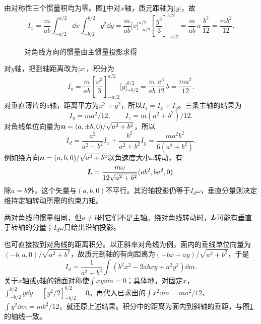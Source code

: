 \begin{solution}
由对称性三个惯量积均为零。图\ref{fig:hw6-1-s}中对$x$轴，质元距轴为$|y|$，故
\[
 I_x=\frac m{ab}\int_{-a/2}^{a/2}\dd x\int_{-b/2}^{b/2}y^2\dd y
 =\frac m{ab}\bigl[x\bigr]_{-a/2}^{a/2}
 \left[\frac{y^3}{3}\right]_{-b/2}^{b/2}
 =\frac m{ab}\,a\,\frac{b^3}{12}=\frac{mb^2}{12}.
\]

\begin{figure}[H]\centering
{}
\caption{对角线方向的惯量由主惯量投影求得}\label{fig:hw6-1-s}
\end{figure}

对$y$轴，把到轴距离改为$|x|$，积分为
\[
I_y=\frac m{ab}\left[\frac{x^3}{3}\right]_{-a/2}^{a/2}
\bigl[y\bigr]_{-b/2}^{b/2}
=\frac m{ab}\,\frac{a^3}{12}\,b=\frac{ma^2}{12}.
\]
对垂直薄片的$z$轴，距离平方为$x^2+y^2$，所以$I_z=I_x+I_y$。三条主轴的结果为
\[
 I_y=ma^2/12,\qquad I_z=m(a^2+b^2)/12.
\]
对角线单位向量为$\bm{n}=(a,\pm b,0)/\sqrt{a^2+b^2}$，所以
\[
 \boxed{I_d=\frac{a^2}{a^2+b^2}I_x+
 \frac{b^2}{a^2+b^2}I_y=\frac{ma^2b^2}{6(a^2+b^2)}}.
\]
例如绕方向$\bm{n}=(a,b,0)/\sqrt{a^2+b^2}$以角速度大小$\omega$转动，有
\[
 \bm{L}=\frac{m\omega}{12\sqrt{a^2+b^2}}(ab^2,ba^2,0).
\]
除$a=b$外，这个矢量与$(a,b,0)$不平行。其沿轴投影仍等于$I_d\omega$，垂直分量则决定维持定轴转动所需的约束力矩。

两对角线的惯量相同，但$a\ne b$时它们不是主轴。绕对角线转动时，$\bm{L}$可能有垂直于转轴的分量；$I_d\omega$只给出沿轴投影。


也可直接按到对角线的距离积分。以正斜率对角线为例，面内的垂线单位向量为$(-b,a,0)/\sqrt{a^2+b^2}$，故质元到轴的有向距离为$(-bx+ay)/\sqrt{a^2+b^2}$，于是
\[
 I_d=\frac1{a^2+b^2}\int(b^2x^2-2abxy+a^2y^2)\dd m.
\]
关于$x$轴或$y$轴的镜面对称使$\int xy\dd m=0$；具体地，对固定$x$，$\int_{-b/2}^{b/2}y\dd y=[y^2/2]_{-b/2}^{b/2}=0$。再代入已求出的$\int x^2\dd m=ma^2/12$、$\int y^2\dd m=mb^2/12$，就还原上述结果。积分中的距离为面内到斜轴的垂距，与图\ref{fig:hw6-1-s}的轴线一致。

\end{solution}



